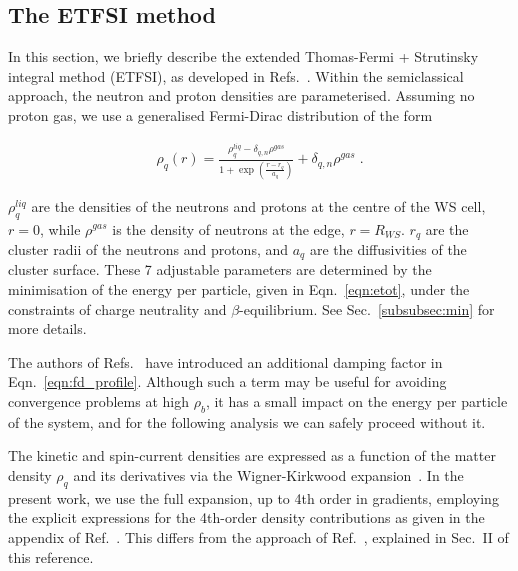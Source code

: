 \documentclass[
    amsmath,amssymb,
    aps,
    prc,
    floatfix,
]{revtex4-2}
\begin{document}
\subsection{The ETFSI method}\label{subsec:etf}

In this section, we briefly describe the extended Thomas-Fermi + Strutinsky integral method (ETFSI), as developed in Refs.~\cite{Grammaticos1979,bartel2002nuclear,onsi2008semi,pearsonInnerCrustNeutron2012}. 
Within the semiclassical approach, the neutron and proton densities are parameterised. Assuming no proton gas, we use a generalised Fermi-Dirac distribution of the form

    \begin{eqnarray}\label{eqn:fd_profile}
        \rho_q(r)=\frac{\rho_q^{liq}-\delta_{q,n}\rho^{gas}}{1+\exp\left(\frac{r-r_q}{a_q} \right)}+\delta_{q,n}\rho^{gas}\;.
    \end{eqnarray}

\noindent $\rho_q^{liq}$ are the densities of the neutrons and protons at the centre of the WS cell, $r=0$, while $\rho^{gas}$ is the density of neutrons at the edge, $r=R_{WS}$. $r_q$ are the cluster radii of the neutrons and protons, and $a_q$ are the diffusivities of the cluster surface.
These 7 adjustable parameters are determined by the minimisation of the energy per particle, given in Eqn.~\ref{eqn:etot}, under the constraints of charge neutrality and $\beta$-equilibrium. See Sec.~\ref{subsubsec:min} for more details. 

The authors of Refs.~\cite{onsi2008semi,pearsonInnerCrustNeutron2012,pearsonUnifiedEquationsState2018,pearsonErratumUnifiedEquations2019} have introduced an additional damping factor in Eqn.~\ref{eqn:fd_profile}. Although such a term may be useful for avoiding convergence problems at high $\rho_b$, it has a small impact on the energy per particle of the system, and for the following analysis we can safely proceed without it.

The kinetic and spin-current densities are expressed as a function of the matter density $\rho_q$ and its derivatives via the Wigner-Kirkwood expansion~\cite{ring2004nuclear}. In the present work, we use the full expansion, up to 4th order in gradients, employing the explicit expressions for the 4th-order density contributions as given in the appendix of Ref.~\cite{bartel2002nuclear}. This differs from the approach of Ref.~\cite{pearsonInnerCrustNeutron2012}, explained in Sec.~II of this reference.
\end{document}
